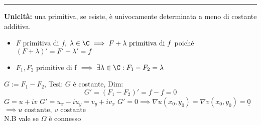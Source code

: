 \noindent\rule{\textwidth}{0.5pt}
\textbf{Unicità: }una primitiva, se esiste, è univocamente determinata a meno di costante additiva.
\begin{itemize}
	\item $F$ primitiva di $f$, $\lambda\in\C\implies F+\lambda \text{ primitiva di }f$ poiché $(F+\lambda)'=F'+\lambda'=f$
	\item $F_1,F_2$ primitive di f $\implies\exists \lambda\in\C:F_1-F_2=\lambda$
\end{itemize}
$G:=F_1-F_2$, Tesi: $G$ è costante, Dim: \[G'=(F_1-F_2)'=f-f=0\]
$G=u+iv$ $G'=u_x-iu_y=v_y+iv_x$ $G'=0\implies \nabla u(x_0,y_0)=\nabla v(x_0,y_0)=\underline 0$
\\$\implies u \text{ costante},\ v \text{ costante}$
\\N.B vale se $\Omega$ è connesso 

